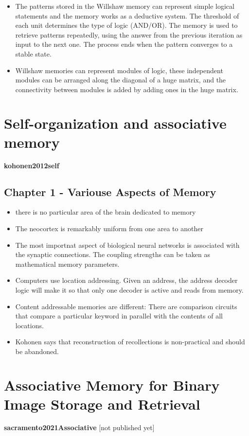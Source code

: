 \documentclass{article}
\begin{document}
\begin{itemize}
\item The patterns stored in the Willshaw memory can represent simple logical statements and the memory works as a deductive system. The threshold of each unit determines the type of logic (AND/OR). The memory is used to retrieve patterns repeatedly, using the answer from the previous iteration as input to the next one. The process ends when the pattern converges to a stable state.
\item Willshaw memories can represent modules of logic, these independent modules can be arranged along the diagonal of a huge matrix, and the connectivity between modules is added by adding ones in the huge matrix.
\end{itemize}

\section{Self-organization and associative memory}
\textbf{kohonen2012self} \cite{kohonen2012self}\newline
\subsection{Chapter 1 - Variouse Aspects of Memory}
\begin{itemize}
\item there is no particular area of the brain dedicated to memory
\item The neocortex is remarkably uniform from one area to another
\item The most importnat aspect of biological neural networks is associated with the synaptic connections. The coupling strengths can be taken as mathematical memory parameters.
\item Computers use location addressing. Given an address, the address decoder logic will make it so that only one decoder is active and reads from memory.
\item Content addressable memories are different: There are comparison circuits that compare a particular keyword in parallel with the contents of all locations.
\item Kohonen says that reconstruction of recollections is non-practical and should be abandoned.
\end{itemize}

\section{Associative Memory for Binary Image Storage and Retrieval}
\textbf{sacramento2021Associative} [not published yet]
\end{document}
